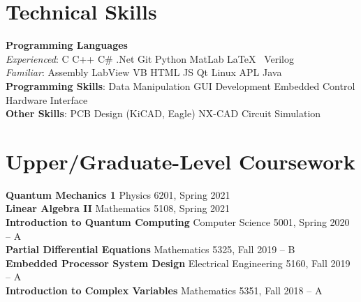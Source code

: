 \documentclass[letterpaper,11pt]{article}
\begin{document}
\section{Technical Skills}
 \begin{itemize}[leftmargin=0.15in, label={}]
    \small{\item{
     \textbf{Programming Languages}\\
     \quad \textit{Experienced}{: C \textbullet{}  C++ \textbullet{} C\# \textbullet{} .Net \textbullet{}	Git \textbullet{} Python \textbullet{} MatLab \textbullet{} \LaTeX\ \textbullet{} Verilog} \\
     \quad \textit{Familiar}{: Assembly \textbullet{} LabView \textbullet{} VB \textbullet{} HTML \textbullet{} JS \textbullet{} Qt \textbullet{} Linux \textbullet{} APL \textbullet{} Java} \\
     \textbf{Programming Skills}{: Data Manipulation \textbullet{} GUI Development \textbullet{} Embedded Control \textbullet{} Hardware Interface} \\
     \textbf{Other Skills}{: PCB Design (KiCAD, Eagle) \textbullet{} NX-CAD \textbullet{} Circuit Simulation} \\
    }}
 \end{itemize}

\section{Upper/Graduate-Level Coursework}
\begin{itemize}[leftmargin=0.15in, label={}]
	\small{\item{
			\textbf{Quantum Mechanics 1}{ Physics 6201, Spring 2021} \\
			\textbf{Linear Algebra II}{ Mathematics 5108, Spring 2021}\\
			\textbf{Introduction to Quantum Computing}{ Computer Science 5001, Spring 2020 -- A} \\
			\textbf{Partial Differential Equations}{ Mathematics 5325, Fall 2019 -- B}\\
			\textbf{Embedded Processor System Design}{ Electrical Engineering 5160, Fall 2019 -- A}\\
			\textbf{Introduction to Complex Variables}{ Mathematics 5351, Fall 2018 -- A} \\
			
			
	}}
\end{itemize}

\end{document}
